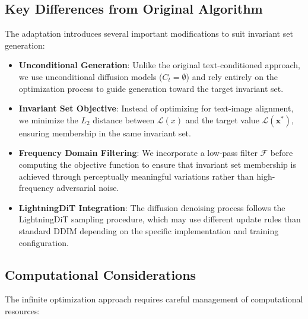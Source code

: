 \documentclass[licencjacka,en]{pracamgr}
\begin{document}
\subsection{Key Differences from Original Algorithm}

The adaptation introduces several important modifications to suit invariant set generation:

\begin{itemize}
    \item \textbf{Unconditional Generation}: Unlike the original text-conditioned approach, we use unconditional diffusion models ($C_t = \emptyset$) and rely entirely on the optimization process to guide generation toward the target invariant set.
    
    \item \textbf{Invariant Set Objective}: Instead of optimizing for text-image alignment, we minimize the $L_2$ distance between $\mathcal{L}(x)$ and the target value $\mathcal{L}(\mathbf{x^*})$, ensuring membership in the same invariant set.
    
    \item \textbf{Frequency Domain Filtering}: We incorporate a low-pass filter $\mathcal{F}$ before computing the objective function to ensure that invariant set membership is achieved through perceptually meaningful variations rather than high-frequency adversarial noise.
    
    \item \textbf{LightningDiT Integration}: The diffusion denoising process follows the LightningDiT sampling procedure, which may use different update rules than standard DDIM depending on the specific implementation and training configuration.
\end{itemize}

\subsection{Computational Considerations}

The infinite optimization approach requires careful management of computational resources:
\end{document}
